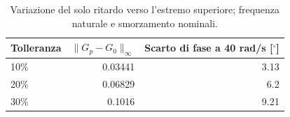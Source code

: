 \begin{table}[htbp]\centering\small
\setlength{\tabcolsep}{4pt}
\begin{tabular}{lrr}\toprule
Tolleranza & $\|G_p-G_0\|_\infty$ & Scarto di fase a 40 rad/s [$^\circ$]\\\midrule
\num{10}\% & \num{0.03441} & \num{3.13}\\
\num{20}\% & \num{0.06829} & \num{6.2}\\
\num{30}\% & \num{0.1016} & \num{9.21}\\
\bottomrule\end{tabular}
\caption{Variazione del solo ritardo verso l'estremo superiore; frequenza naturale e smorzamento nominali.}
\end{table}
